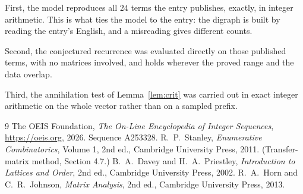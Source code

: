 \documentclass[11pt,a4paper]{article}
\theoremstyle{plain}
\theoremstyle{definition}
\begin{document}
First, the model reproduces all $24$ terms the entry publishes, exactly, in integer
arithmetic. This is what ties the model to the entry: the digraph is built by reading the
entry's English, and a misreading gives different counts.

Second, the conjectured recurrence was evaluated directly on those published terms, with no
matrices involved, and holds wherever the proved range and the data overlap.

Third, the annihilation test of Lemma~\ref{lem:crit} was carried out in exact integer
arithmetic on the whole vector rather than on a sampled prefix.

\begin{thebibliography}{9}
 The OEIS Foundation, \emph{The On-Line Encyclopedia of Integer
Sequences}, \url{https://oeis.org}, 2026. Sequence A253328.
 R.~P.~Stanley, \emph{Enumerative Combinatorics}, Volume 1, 2nd ed.,
Cambridge University Press, 2011. (Transfer-matrix method, Section 4.7.)
 B.~A.~Davey and H.~A.~Priestley, \emph{Introduction to Lattices and
Order}, 2nd ed., Cambridge University Press, 2002.
 R.~A.~Horn and C.~R.~Johnson, \emph{Matrix Analysis}, 2nd ed., Cambridge
University Press, 2013.
\end{thebibliography}
\end{document}
